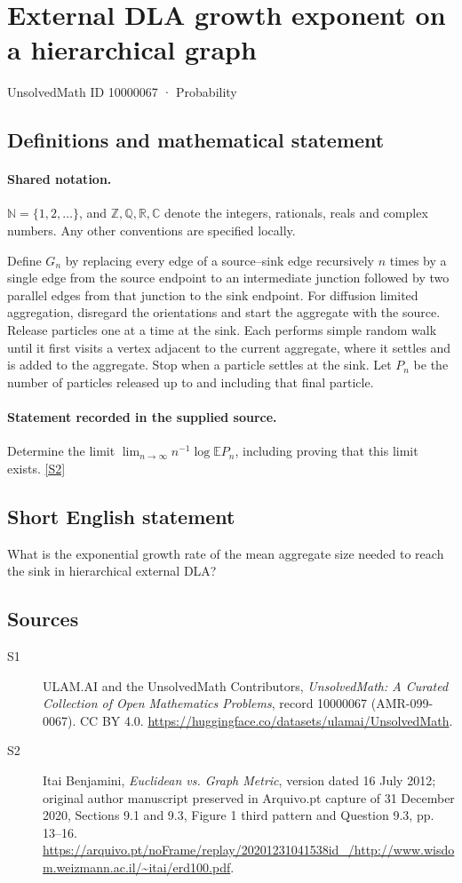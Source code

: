 \documentclass[11pt]{article}
\newcommand{\sref}[2]{\hyperlink{source:#1:#2}{[S#2]}}
\begin{document}
\setcounter{section}{10000066}
\section{External DLA growth exponent on a hierarchical graph}\label{10000067}
{\small\sffamily UnsolvedMath ID 10000067 · Probability}
\subsection{Definitions and mathematical statement}

\paragraph{Shared notation.}$\mathbb N=\{1,2,\ldots\}$, and $\mathbb Z,\mathbb Q,\mathbb R,\mathbb C$ denote the integers, rationals, reals and complex numbers. Any other conventions are specified locally.


Define $G_n$ by replacing every edge of a source--sink edge recursively $n$ times by a single edge from the source endpoint to an intermediate junction followed by two parallel edges from that junction to the sink endpoint. For diffusion limited aggregation, disregard the orientations and start the aggregate with the source. Release particles one at a time at the sink. Each performs simple random walk until it first visits a vertex adjacent to the current aggregate, where it settles and is added to the aggregate. Stop when a particle settles at the sink. Let $P_n$ be the number of particles released up to and including that final particle.
\paragraph{Statement recorded in the supplied source.}
Determine the limit $\lim_{n\to\infty}n^{-1}\log\mathbb E P_n$, including proving that this limit exists. \sref{10000067}{2}
\subsection{Short English statement}
What is the exponential growth rate of the mean aggregate size needed to reach the sink in hierarchical external DLA?
\subsection{Sources}
\begin{description}
\item[\hypertarget{source:10000067:1}{S1}] ULAM.AI and the UnsolvedMath Contributors, \emph{UnsolvedMath: A Curated Collection of Open Mathematics Problems}, record 10000067 (AMR-099-0067). CC BY 4.0. \url{https://huggingface.co/datasets/ulamai/UnsolvedMath}.
\item[\hypertarget{source:10000067:2}{S2}] Itai Benjamini, \emph{Euclidean vs. Graph Metric}, version dated 16 July 2012; original author manuscript preserved in Arquivo.pt capture of 31 December 2020, Sections 9.1 and 9.3, Figure 1 third pattern and Question 9.3, pp. 13--16. \url{https://arquivo.pt/noFrame/replay/20201231041538id_/http://www.wisdom.weizmann.ac.il/~itai/erd100.pdf}.
\end{description}
\label{end:10000067}
\end{document}
